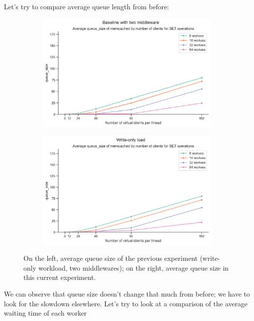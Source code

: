 \documentclass[11pt,a4paper]{article}
\begin{document}
\begin{itemize}
		Let's try to compare average queue length from before:
		\begin{figure}[H]
			\begin{subfigure}[b]{0.5\linewidth}
				\includegraphics[width=\linewidth]{images/middleware_2/last_graph_set_queue_size.pdf}
			\end{subfigure}
			\begin{subfigure}[b]{0.5\linewidth}
				\includegraphics[width=\linewidth]{images/writes_1/queue_writes_1.pdf}
			\end{subfigure}
			\caption{On the left, average queue size of the previous experiment (write-only workload, two middlewares); on the right, average queue size in this current experiment.}
			\label{fig:boat1}
		\end{figure}
		We can observe that queue size doesn't change that much from before; we have to look for the slowdown elsewhere.
		Let's try to look at a comparison of the average waiting time of each worker

\end{itemize}
\end{document}
